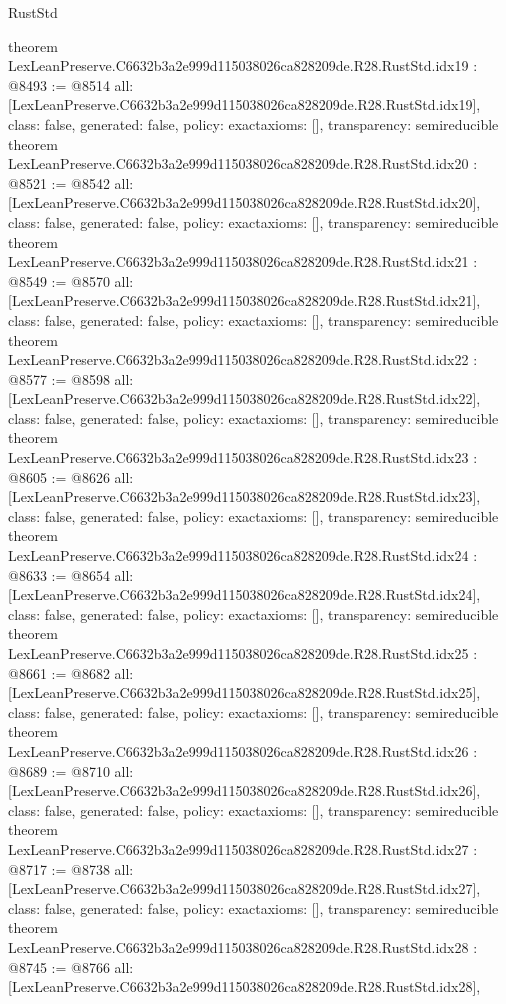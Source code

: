 \begin{lexlean}{RustStd}
\begin{coremodule}
{}
theorem LexLeanPreserve.C6632b3a2e999d115038026ca828209de.R28.RustStd.idx19 : @8493 := @8514 {
  all: [LexLeanPreserve.C6632b3a2e999d115038026ca828209de.R28.RustStd.idx19],
  class: false,
  generated: false,
  policy: exact{axioms: []},
  transparency: semireducible
}
theorem LexLeanPreserve.C6632b3a2e999d115038026ca828209de.R28.RustStd.idx20 : @8521 := @8542 {
  all: [LexLeanPreserve.C6632b3a2e999d115038026ca828209de.R28.RustStd.idx20],
  class: false,
  generated: false,
  policy: exact{axioms: []},
  transparency: semireducible
}
theorem LexLeanPreserve.C6632b3a2e999d115038026ca828209de.R28.RustStd.idx21 : @8549 := @8570 {
  all: [LexLeanPreserve.C6632b3a2e999d115038026ca828209de.R28.RustStd.idx21],
  class: false,
  generated: false,
  policy: exact{axioms: []},
  transparency: semireducible
}
theorem LexLeanPreserve.C6632b3a2e999d115038026ca828209de.R28.RustStd.idx22 : @8577 := @8598 {
  all: [LexLeanPreserve.C6632b3a2e999d115038026ca828209de.R28.RustStd.idx22],
  class: false,
  generated: false,
  policy: exact{axioms: []},
  transparency: semireducible
}
theorem LexLeanPreserve.C6632b3a2e999d115038026ca828209de.R28.RustStd.idx23 : @8605 := @8626 {
  all: [LexLeanPreserve.C6632b3a2e999d115038026ca828209de.R28.RustStd.idx23],
  class: false,
  generated: false,
  policy: exact{axioms: []},
  transparency: semireducible
}
theorem LexLeanPreserve.C6632b3a2e999d115038026ca828209de.R28.RustStd.idx24 : @8633 := @8654 {
  all: [LexLeanPreserve.C6632b3a2e999d115038026ca828209de.R28.RustStd.idx24],
  class: false,
  generated: false,
  policy: exact{axioms: []},
  transparency: semireducible
}
theorem LexLeanPreserve.C6632b3a2e999d115038026ca828209de.R28.RustStd.idx25 : @8661 := @8682 {
  all: [LexLeanPreserve.C6632b3a2e999d115038026ca828209de.R28.RustStd.idx25],
  class: false,
  generated: false,
  policy: exact{axioms: []},
  transparency: semireducible
}
theorem LexLeanPreserve.C6632b3a2e999d115038026ca828209de.R28.RustStd.idx26 : @8689 := @8710 {
  all: [LexLeanPreserve.C6632b3a2e999d115038026ca828209de.R28.RustStd.idx26],
  class: false,
  generated: false,
  policy: exact{axioms: []},
  transparency: semireducible
}
theorem LexLeanPreserve.C6632b3a2e999d115038026ca828209de.R28.RustStd.idx27 : @8717 := @8738 {
  all: [LexLeanPreserve.C6632b3a2e999d115038026ca828209de.R28.RustStd.idx27],
  class: false,
  generated: false,
  policy: exact{axioms: []},
  transparency: semireducible
}
theorem LexLeanPreserve.C6632b3a2e999d115038026ca828209de.R28.RustStd.idx28 : @8745 := @8766 {
  all: [LexLeanPreserve.C6632b3a2e999d115038026ca828209de.R28.RustStd.idx28],
}
\end{coremodule}
\end{lexlean}
